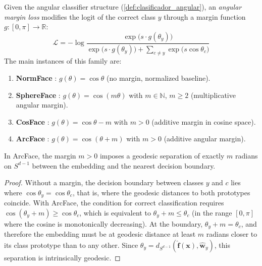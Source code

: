 \begin{definition}\label{def:perdida_margen_angular}
Given the angular classifier structure (\autoref{def:clasificador_angular}), an \textit{angular margin loss} modifies the logit of the correct class $y$ through a margin function $g: [0, \pi] \to \mathbb{R}$:
\begin{equation}
\mathcal{L} = -\log \frac{\exp\bigl(s \cdot g(\theta_y)\bigr)}{\exp\bigl(s \cdot g(\theta_y)\bigr) + \sum_{c \neq y} \exp\bigl(s \cos\theta_c\bigr)}
\label{eq:perdida_margen_angular}
\end{equation}
The main instances of this family are:
\begin{enumerate}
    \item \textbf{NormFace} \citep{wang2017normface}: $g(\theta) = \cos\theta$ (no margin, normalized baseline).
    \item \textbf{SphereFace} \citep{liu2017sphereface}: $g(\theta) = \cos(m\theta)$ with $m \in \mathbb{N}$, $m \geq 2$ (multiplicative angular margin).
    \item \textbf{CosFace} \citep{wang2018cosface}: $g(\theta) = \cos\theta - m$ with $m > 0$ (additive margin in cosine space).
    \item \textbf{ArcFace} \citep{deng2019arcface}: $g(\theta) = \cos(\theta + m)$ with $m > 0$ (additive angular margin).
\end{enumerate}
\end{definition}

\begin{proposition}\label{prop:interpretacion_geodesica_margen}
In ArcFace, the margin $m > 0$ imposes a geodesic separation of exactly $m$ radians on $S^{d-1}$ between the embedding and the nearest decision boundary.
\end{proposition}

\begin{proof}
Without a margin, the decision boundary between classes $y$ and $c$ lies where $\cos\theta_y = \cos\theta_c$, that is, where the geodesic distances to both prototypes coincide. With ArcFace, the condition for correct classification requires $\cos(\theta_y + m) \geq \cos\theta_c$, which is equivalent to $\theta_y + m \leq \theta_c$ (in the range $[0, \pi]$ where the cosine is monotonically decreasing). At the boundary, $\theta_y + m = \theta_c$, and therefore the embedding must be at geodesic distance at least $m$ radians closer to its class prototype than to any other. Since $\theta_y = d_{S^{d-1}}(\hat{\mathbf{f}}(\mathbf{x}), \hat{\mathbf{w}}_y)$, this separation is intrinsically geodesic.
\end{proof}

